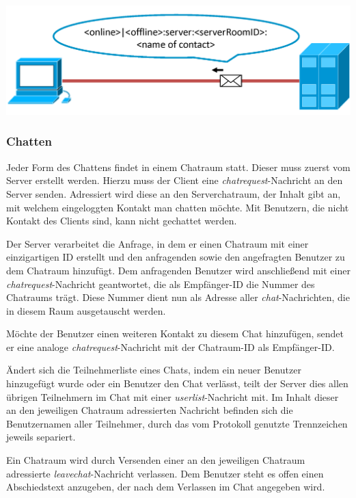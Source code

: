 \documentclass[12pt,a4paper,bibliography=totocnumbered,listof=totocnumbered]{scrartcl}
\begin{document}
\vspace{1em}
\begin{minipage}{\linewidth}
	\centering
	\includegraphics[width=0.7\linewidth]{img/status1.png}
	\label{fig:status1}
\end{minipage}

\subsubsection{Chatten}
Jeder Form des Chattens findet in einem Chatraum statt. Dieser muss zuerst vom Server erstellt werden. Hierzu muss der Client eine \textit{chatrequest}-Nachricht an den Server senden. Adressiert wird diese an den Serverchatraum, der Inhalt gibt an, mit welchem eingeloggten Kontakt man chatten möchte. Mit Benutzern, die nicht Kontakt des Clients sind, kann nicht gechattet werden.


Der Server verarbeitet die Anfrage, in dem er einen Chatraum mit einer einzigartigen ID erstellt und den anfragenden sowie den angefragten Benutzer zu dem Chatraum hinzufügt. Dem anfragenden Benutzer wird anschließend mit einer \textit{chatrequest}-Nachricht geantwortet, die als Empfänger-ID die Nummer des Chatraums trägt. Diese Nummer dient nun als Adresse aller \textit{chat}-Nachrichten, die in diesem Raum ausgetauscht werden. 


Möchte der Benutzer einen weiteren Kontakt zu diesem Chat hinzufügen, sendet er eine analoge \textit{chatrequest}-Nachricht mit der Chatraum-ID als Empfänger-ID.

Ändert sich die Teilnehmerliste eines Chats, indem ein neuer Benutzer hinzugefügt wurde oder ein Benutzer den Chat verlässt, teilt der Server dies allen übrigen Teilnehmern im Chat mit einer \textit{userlist}-Nachricht mit. Im Inhalt dieser an den jeweiligen Chatraum adressierten Nachricht befinden sich die Benutzernamen aller Teilnehmer, durch das vom Protokoll genutzte Trennzeichen jeweils separiert.


Ein Chatraum wird durch Versenden einer an den jeweiligen Chatraum adressierte \textit{leavechat}-Nachricht verlassen. Dem Benutzer steht es offen einen Abschiedstext anzugeben, der nach dem Verlassen im Chat angegeben wird.
\end{document}
